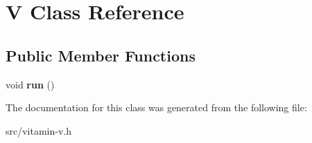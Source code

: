 \hypertarget{class_v}{}\section{V Class Reference}
\label{class_v}
\subsection*{Public Member Functions}
\begin{DoxyCompactItemize}
\item 
void {\bfseries run} ()\hypertarget{class_v_acc626f5d251a8559707b91dd2a9552cc}{}\label{class_v_acc626f5d251a8559707b91dd2a9552cc}

\end{DoxyCompactItemize}


The documentation for this class was generated from the following file\+:\begin{DoxyCompactItemize}
\item 
src/vitamin-\/v.\+h\end{DoxyCompactItemize}
